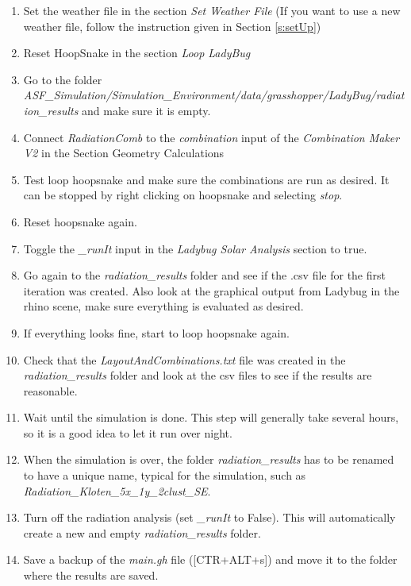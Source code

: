 	\begin{enumerate}

	\item Set the weather file in the section \emph{Set Weather File} (If you want to use a new weather file, follow the instruction given in Section \ref{s:setUp})

	\item Reset HoopSnake in the section \emph{Loop LadyBug}

	\item Go to the folder \emph{ASF\_Simulation/Simulation\_Environment/data/}\linebreak\emph{grasshopper/LadyBug/radiation\_results} and make sure it is empty. 

	\item Connect \emph{RadiationComb} to the \emph{combination} input of the \emph{Combination Maker V2} in the Section Geometry Calculations

	\item Test loop hoopsnake and make sure the combinations are run as desired. It can be stopped by right clicking on hoopsnake and selecting \emph{stop}. 

	\item Reset hoopsnake again. 

	\item Toggle the \emph{\_runIt} input in the \emph{Ladybug Solar Analysis} section to true. 

	\item Go again to the \emph{radiation\_results} folder and see if the .csv file for the first iteration was created. Also look at the graphical output from Ladybug in the rhino scene, make sure everything is evaluated as desired. 

	\item If everything looks fine, start to loop hoopsnake again. 

	\item  Check that the \emph{LayoutAndCombinations.txt} file was created in the \emph{radiation\_results} folder and look at the csv files to see if the results are reasonable. 

	\item  Wait until the simulation is done. This step will generally take several hours, so it is a good idea to let it run over night. 

	\item  When the simulation is over, the folder \emph{radiation\_results} has to be renamed to have a unique name, typical for the simulation, such as \emph{Radiation\_Kloten\_5x\_1y\_2clust\_SE}. 

	\item  Turn off the radiation analysis (set \emph{\_runIt} to False). This will automatically create a new and empty \emph{radiation\_results} folder.  

	\item  Save a backup of the \emph{main.gh} file ([CTR+ALT+s]) and move it to the folder where the results are saved. 
	\end{enumerate}

